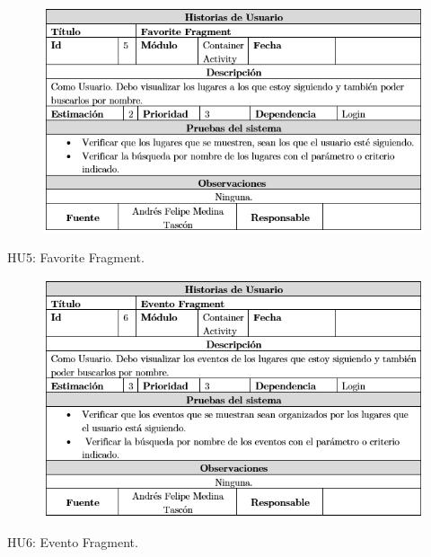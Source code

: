 \documentclass[12pt,letterpaper,openany]{book}
\begin{document}
\begin{table}[H]
\begin{center}
\begin{figure}[H]
\begin{center}
\includegraphics[width=13cm]{./imagenes/HU/HU5}
\end{center}
\end{figure}
\end{center}
\caption{HU5: Favorite Fragment.}
\end{table}

\begin{table}[H]
\begin{center}
\begin{figure}[H]
\begin{center}
\includegraphics[width=13cm]{./imagenes/HU/HU6}
\end{center}
\end{figure}
\end{center}
\caption{HU6: Evento Fragment.}
\end{table}
\end{document}
